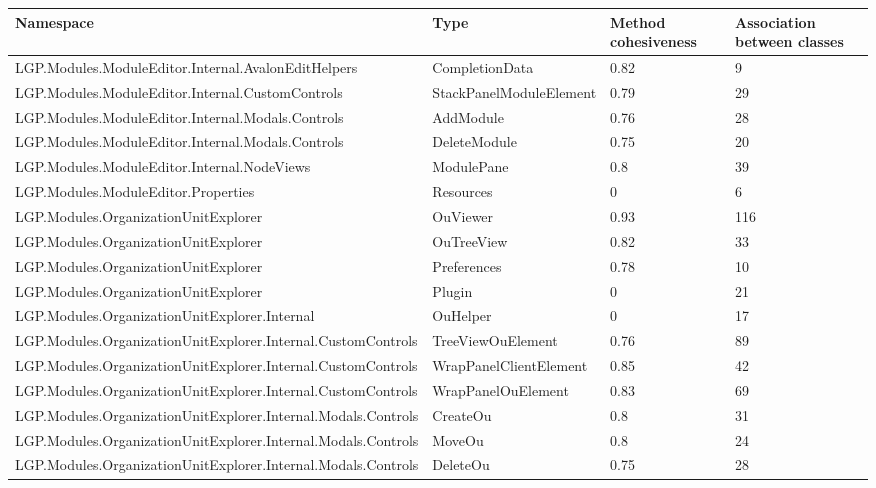 		\newpage
			
			\begin{table}[h!t]
				\footnotesize{\begin{tabular}{ | p{85mm} | p{35mm} | p{13mm} | p{14mm}  | }	
																						\hline
				Namespace & Type & Method cohesiveness & Association between classes  \\ \hline				
				LGP.Modules.ModuleEditor.Internal.AvalonEditHelpers & CompletionData & 0.82  & 9 \\ \hline
				LGP.Modules.ModuleEditor.Internal.CustomControls & StackPanelModuleElement & 0.79  & 29 \\ \hline
				LGP.Modules.ModuleEditor.Internal.Modals.Controls & AddModule & 0.76  & 28 \\ \hline
				LGP.Modules.ModuleEditor.Internal.Modals.Controls & DeleteModule & 0.75  & 20 \\ \hline
				LGP.Modules.ModuleEditor.Internal.NodeViews & ModulePane & 0.8   & 39 \\ \hline
				LGP.Modules.ModuleEditor.Properties & Resources & 0     & 6 \\ \hline
				LGP.Modules.OrganizationUnitExplorer & OuViewer & \cellcolor{ored}0.93  & \cellcolor{ored}116 \\ \hline
				LGP.Modules.OrganizationUnitExplorer & OuTreeView & 0.82  & 33 \\ \hline
				LGP.Modules.OrganizationUnitExplorer & Preferences & 0.78  & 10 \\ \hline
				LGP.Modules.OrganizationUnitExplorer & Plugin & 0     & 21 \\ \hline
				LGP.Modules.OrganizationUnitExplorer.Internal & OuHelper & 0     & 17 \\ \hline
				LGP.Modules.OrganizationUnitExplorer.Internal.CustomControls & TreeViewOuElement & 0.76  & \cellcolor{ored}89 \\ \hline
				LGP.Modules.OrganizationUnitExplorer.Internal.CustomControls & WrapPanelClientElement & \cellcolor{ored}0.85  & \cellcolor{ored}42 \\ \hline
				LGP.Modules.OrganizationUnitExplorer.Internal.CustomControls & WrapPanelOuElement & 0.83  & \cellcolor{ored}69 \\ \hline
				LGP.Modules.OrganizationUnitExplorer.Internal.Modals.Controls & CreateOu & 0.8   & 31 \\ \hline
				LGP.Modules.OrganizationUnitExplorer.Internal.Modals.Controls & MoveOu & 0.8   & 24 \\ \hline
				LGP.Modules.OrganizationUnitExplorer.Internal.Modals.Controls & DeleteOu & 0.75  & 28 \\ \hline

\end{tabular}}
\end{table}
